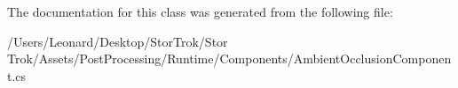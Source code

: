 The documentation for this class was generated from the following file\+:\begin{DoxyCompactItemize}
\item 
/\+Users/\+Leonard/\+Desktop/\+Stor\+Trok/\+Stor Trok/\+Assets/\+Post\+Processing/\+Runtime/\+Components/Ambient\+Occlusion\+Component.\+cs\end{DoxyCompactItemize}
